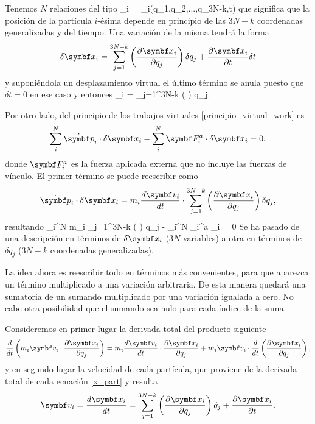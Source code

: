 \documentclass[10pt,oneside]{CBFT_book}
\begin{document}
Tenemos $N$ relaciones del tipo 
\be
	_i = _i(q_1,q_2,...,q_{3N-k},t)
	\label{x_part}
\ee
que significa que la posición de la partícula $i$-ésima depende en principio de las $3N-k$ coordenadas
generalizadas y del tiempo. Una variación de la misma tendrá la forma
\[
	\delta \vb{x}_i =  \sum_{j=1}^{3N-k} \left( \dpar{\vb{x}_i}{q_j} \right) \delta q_j + 
	\dpar{\vb{x}_i}{t}\delta t
\]
y suponiéndola un desplazamiento virtual el último término se anula puesto que $\delta t=0$ en ese
caso y entonces
\be
	\delta {}_i =  \sum_{j=1}^{3N-k} \left(  \right) \delta q_j.
	\label{delta_x_to_delta_q}
\ee

Por otro lado, del principio de los trabajos virtuales \eqref{principio_virtual_work} es
\[
	\sum_i^N \dot{\vb{p}}_i \cdot \delta \vb{x}_i - \sum_i^N  \vb{F}_i^a \cdot \delta \vb{x}_i = 0,
\]
donde $\vb{F}_i^a$ es la fuerza aplicada externa que no incluye las fuerzas de vínculo. El primer término 
se puede reescribir como
\[
	\dot{\vb{p}}_i \cdot \delta \vb{x}_i = m_i \dtot{\vb{v}_i}{t} \cdot \sum_{j=1}^{3N-k} 
	\left( \dpar{\vb{x}_i}{q_j} \right) \delta q_j,
\]
resultando
\be
	\sum_i^N m_i  \cdot \sum_{j=1}^{3N-k} \left(  \right)
	\delta q_j - \sum_i^N  _i^a \cdot \delta {}_i = 0
	\label{virtual_work_2}
\ee
Se ha pasado de una descripción en términos de $\delta \vb{x}_i$ ($3N$ variables) a otra en términos de $\delta q_j$
($3N-k$ coordenadas generalizadas).

La idea ahora es reescribir todo en términos más convenientes, para que aparezca un término multiplicado
a una variación arbitraria. De esta manera quedará una sumatoria de un sumando multiplicado por una
variación igualada a cero. No cabe otra posibilidad que el sumando sea nulo para cada índice de la suma.

Consideremos en primer lugar la derivada total del producto siguiente
\[
	\frac{d}{dt}\left( m_i\vb{v}_i \cdot \dpar{\vb{x}_i}{q_j} \right) =
	m_i \dtot{\vb{v}_i}{t} \cdot \dpar{\vb{x}_i}{q_j} + m_i \vb{v}_i 
	\cdot \frac{d}{dt}\left(\dpar{\vb{x}_i}{q_j}\right),
\]
y en segundo lugar la velocidad de cada partícula, que proviene de la derivada total de cada ecuación 
\eqref{x_part} y resulta
\[
	\vb{v}_i = \dtot{\vb{x}_i}{t} = \sum_{j=1}^{3N-k} \left( \dpar{\vb{x}_i}{q_j} \right)
	\dot{q}_j + \dpar{\vb{x}_i}{t}.
\]
\end{document}
